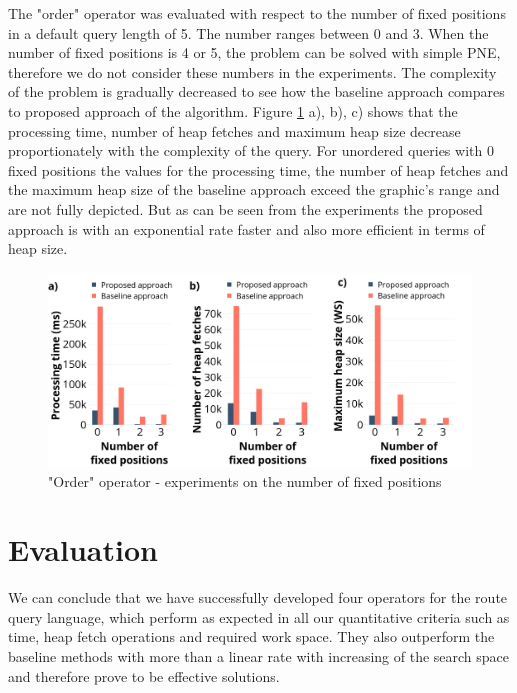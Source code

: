 The "order" operator was evaluated with respect to the number of fixed positions in a default query length of 5. The number ranges between 0 and 3. When the number of fixed positions is 4 or 5, the problem can be solved with simple PNE, therefore we do not consider these numbers in the experiments. The complexity of the problem is gradually decreased to see how the baseline approach compares to proposed approach of the algorithm.  
Figure \ref{fig:order} a), b), c) shows that the processing time, number of heap fetches and maximum heap size decrease proportionately with the complexity of the query. For unordered queries with 0 fixed positions the values for the processing time, the number of heap fetches and the maximum heap size of the baseline approach exceed the graphic's range and are not fully depicted. But as can be seen from the experiments the proposed approach is with an exponential rate faster and also more efficient in terms of heap size. \newline

\enlargethispage*{30pt}

\begin{figure}[H]
	\includegraphics[scale=0.33]{images/order_30.png}
	\centering
	\caption{"Order" operator - experiments on the number of fixed positions}
	\label{fig:order}
\end{figure}

\section{Evaluation}
\label{sec:eval}

We can conclude that we have successfully developed four operators for the route query language, which perform as expected in all our quantitative criteria such as time, heap fetch operations and required work space. They also outperform the baseline methods with more than a linear rate with increasing of the search space and therefore prove to be effective solutions.

